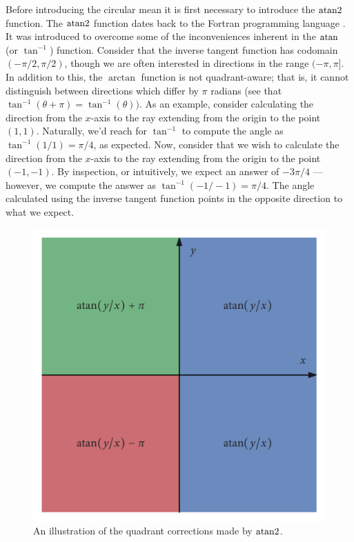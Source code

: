 Before introducing the circular mean it is first necessary to introduce the
$\operatorname{atan2}$ function. The $\operatorname{atan2}$ function dates back to the Fortran
programming language \parencite{organick66}. It was introduced to overcome some
of the inconveniences inherent in the $\atan$ (or $\tan^{-1}$) function.
Consider that the inverse tangent function has codomain $(-\pi/2, \pi/2)$,
though we are often interested in directions in the range $(-\pi, \pi]$. In
addition to this, the $\arctan$ function is not quadrant-aware; that is, it
cannot distinguish between directions which differ by $\pi$ radians (see that
$\tan^{-1}(\theta + \pi) = \tan^{-1}(\theta))$. As an example, consider
calculating the direction from the $x$-axis to the ray extending from the
origin to the point $(1, 1)$. Naturally, we'd reach for $\tan^{-1}$ to compute
the angle as $\tan^{-1}(1/1) = \pi/4$, as expected. Now, consider that we wish
to calculate the direction from the $x$-axis to the ray extending from the
origin to the point $(-1, -1)$. By inspection, or intuitively, we expect an
answer of $-3\pi/4$ --- however, we compute the answer as $\tan^{-1}(-1/-1) =
\pi/4$. The angle calculated using the inverse tangent function points in the
opposite direction to what we expect.

\begin{figure}[tb]
	\includegraphics{atan_quadrants.pdf}
	\caption{An illustration of the quadrant corrections made by $\operatorname{atan2}$.}
	\label{fig:atan_quadrants}
\end{figure}

